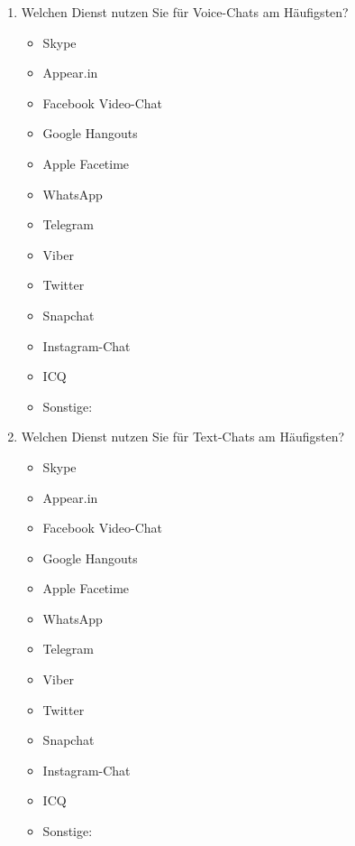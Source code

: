 \begin{enumerate}[resume]
\item Welchen Dienst nutzen Sie für Voice-Chats am Häufigsten?

		\begin{itemize}
		\item[\Circle] Skype
		\item[\Circle] Appear.in
        \item[\Circle] Facebook Video-Chat
        \item[\Circle] Google Hangouts
        \item[\Circle] Apple Facetime
        \item[\Circle] WhatsApp
        \item[\Circle] Telegram
        \item[\Circle] Viber
        \item[\Circle] Twitter
        \item[\Circle] Snapchat
        \item[\Circle] Instagram-Chat
        \item[\Circle] ICQ
        \item[\Circle] Sonstige:~\underline{\hspace{7.5cm}}
        \end{itemize}
        
        
\item Welchen Dienst nutzen Sie für Text-Chats am Häufigsten?

		\begin{itemize}
		\item[\Circle] Skype
		\item[\Circle] Appear.in
        \item[\Circle] Facebook Video-Chat
        \item[\Circle] Google Hangouts
        \item[\Circle] Apple Facetime
        \item[\Circle] WhatsApp
        \item[\Circle] Telegram
        \item[\Circle] Viber
        \item[\Circle] Twitter
        \item[\Circle] Snapchat
        \item[\Circle] Instagram-Chat
        \item[\Circle] ICQ
        \item[\Circle] Sonstige:~\underline{\hspace{7.5cm}}
        \end{itemize}
\end{enumerate}

